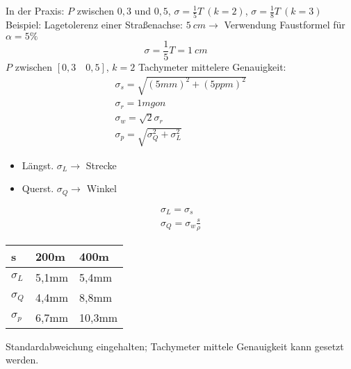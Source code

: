 \documentclass[12pt]{article}
\begin{document}
\newline
In der Praxis: $P$ zwischen $0,3$ und $0,5$, $\sigma = \frac{1}{5}T\ (k=2)$, $\sigma = \frac{1}{8}T\ (k=3)$ \newline
\newline
Beispiel:\newline
Lagetolerenz einer Straßenachse: $5\ cm \longrightarrow$ Verwendung Faustformel für $\alpha = 5 \%$
\begin{equation*}
\sigma = \frac{1}{5} T  = 1\ cm \quad 
\end{equation*}
$P$ zwischen $[0,3\quad 0,5]$, $k=2$ \newline
Tachymeter mittelere Genauigkeit: 
\begin{gather*}
\sigma_s = \sqrt{(5mm)^2 + (5ppm)^2} \\
\sigma_r = 1mgon\\
\sigma_w=\sqrt{2} \sigma_r\\
\sigma_p=\sqrt{\sigma_Q^2 + \sigma_L^2}
\end{gather*}
\begin{itemize}
\item Längst. $\sigma_L \rightarrow$ Strecke \\
\item Querst. $\sigma_Q \rightarrow$ Winkel
\end{itemize}
\begin{gather*}
\sigma_L = \sigma_s\\
\sigma_Q = \sigma_w \frac{s}{\rho}
\end{gather*}
\begin{table}[ht] \centering
	\begin{tabular}{|l|l|l|}
		\hline
		s & 200m  & 400m   \\ \hline
		$\sigma_L$ & 5,1mm & 5,4mm  \\ \hline
		$\sigma_Q$ & 4,4mm & 8,8mm  \\ \hline
		$\sigma_p$ & 6,7mm & 10,3mm \\ \hline
	\end{tabular}
\end{table}
\newline
Standardabweichung eingehalten; Tachymeter mittele Genauigkeit kann gesetzt werden. 
\end{document}
